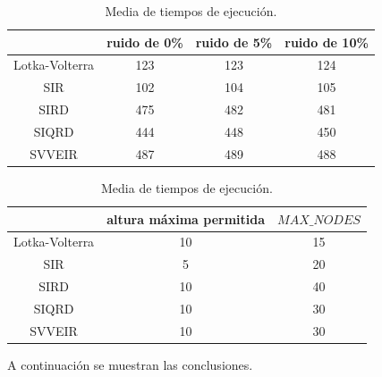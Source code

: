 \begin{table}[!h]
    \centering
    \caption{Media de tiempos de ejecución.}
    \begin{tabular}{|c|c|c|c|}
        \hline
                       & \textbf{ruido de 0\%} & \textbf{ruido de 5\%} & \textbf{ruido de 10\%} \\
        \hline
        Lotka-Volterra & 123                   & 123                   & 124                    \\
        \hline
        SIR            & 102                   & 104                   & 105                    \\
        \hline
        SIRD           & 475                   & 482                   & 481                    \\
        \hline
        SIQRD          & 444                   & 448                   & 450                    \\
        \hline
        SVVEIR         & 487                   & 489                   & 488                    \\
        \hline
    \end{tabular}

    \begin{tabular}{|c|c|c|}
        \hline
                       & \textbf{altura máxima permitida} & $MAX\_NODES$ \\
        \hline
        Lotka-Volterra & 10                               & 15           \\
        \hline
        SIR            & 5                                & 20           \\
        \hline
        SIRD           & 10                               & 40           \\
        \hline
        SIQRD          & 10                               & 30           \\
        \hline
        SVVEIR         & 10                               & 30           \\
        \hline
    \end{tabular}
    \label{table:experiments_times}
\end{table}

A continuación se muestran las conclusiones.